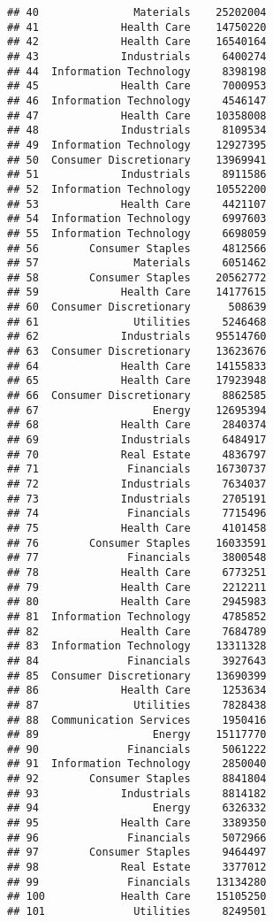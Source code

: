 \documentclass[
]{article}
\begin{document}
\begin{verbatim}
## 40               Materials    25202004
## 41             Health Care    14750220
## 42             Health Care    16540164
## 43             Industrials     6400274
## 44  Information Technology     8398198
## 45             Health Care     7000953
## 46  Information Technology     4546147
## 47             Health Care    10358008
## 48             Industrials     8109534
## 49  Information Technology    12927395
## 50  Consumer Discretionary    13969941
## 51             Industrials     8911586
## 52  Information Technology    10552200
## 53             Health Care     4421107
## 54  Information Technology     6997603
## 55  Information Technology     6698059
## 56        Consumer Staples     4812566
## 57               Materials     6051462
## 58        Consumer Staples    20562772
## 59             Health Care    14177615
## 60  Consumer Discretionary      508639
## 61               Utilities     5246468
## 62             Industrials    95514760
## 63  Consumer Discretionary    13623676
## 64             Health Care    14155833
## 65             Health Care    17923948
## 66  Consumer Discretionary     8862585
## 67                  Energy    12695394
## 68             Health Care     2840374
## 69             Industrials     6484917
## 70             Real Estate     4836797
## 71              Financials    16730737
## 72             Industrials     7634037
## 73             Industrials     2705191
## 74              Financials     7715496
## 75             Health Care     4101458
## 76        Consumer Staples    16033591
## 77              Financials     3800548
## 78             Health Care     6773251
## 79             Health Care     2212211
## 80             Health Care     2945983
## 81  Information Technology     4785852
## 82             Health Care     7684789
## 83  Information Technology    13311328
## 84              Financials     3927643
## 85  Consumer Discretionary    13690399
## 86             Health Care     1253634
## 87               Utilities     7828438
## 88  Communication Services     1950416
## 89                  Energy    15117770
## 90              Financials     5061222
## 91  Information Technology     2850040
## 92        Consumer Staples     8841804
## 93             Industrials     8814182
## 94                  Energy     6326332
## 95             Health Care     3389350
## 96              Financials     5072966
## 97        Consumer Staples     9464497
## 98             Real Estate     3377012
## 99              Financials    13134280
## 100            Health Care    15105250
## 101              Utilities     8249501

\end{verbatim}
\end{document}
